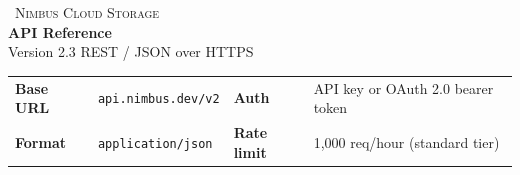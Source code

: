 \documentclass[10pt]{article}
\begin{document}
\begin{tcolorbox}[colback=navy,colframe=navy,arc=2pt,boxrule=0pt,
  left=18pt,right=18pt,top=12pt,bottom=12pt,width=\textwidth,halign=center]
{\color{white}\small\faServer\ \textsc{Nimbus Cloud Storage}}\\[5pt]
{\color{white}\Large\bfseries API Reference}\\[3pt]
{\color{white}\footnotesize Version 2.3 \quad\textbullet\quad REST / JSON over HTTPS}
\end{tcolorbox}

\vspace{6pt}
\begin{tcolorbox}[colback=panelgray,colframe=bordergray,boxrule=0.5pt,arc=3pt,
  left=14pt,right=14pt,top=7pt,bottom=7pt,width=\textwidth]
\small
\begin{tabularx}{\linewidth}{@{}l X l X@{}}
\infoicon{\faGlobe} \textbf{Base URL} & \texttt{\footnotesize api.nimbus.dev/v2} &
\infoicon{\faLock} \textbf{Auth} & API key or OAuth 2.0 bearer token \\[3pt]
\infoicon{\faCode} \textbf{Format} & \texttt{\footnotesize application/json} &
\infoicon{\faClock} \textbf{Rate limit} & 1{,}000 req/hour (standard tier) \\
\end{tabularx}
\end{tcolorbox}
\par










\end{document}
